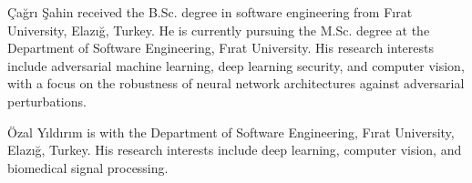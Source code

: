 
\begin{IEEEbiography}[]{{\c{C}}a\u{g}r{\i} {\c{S}}ahin}
received the B.Sc. degree in software engineering from F{\i}rat University, Elaz{\i}\u{g}, Turkey. He is currently pursuing the M.Sc. degree at the Department of Software Engineering, F{\i}rat University. His research interests include adversarial machine learning, deep learning security, and computer vision, with a focus on the robustness of neural network architectures against adversarial perturbations.
\end{IEEEbiography}

\begin{IEEEbiography}[]{\"Ozal Y{\i}ld{\i}r{\i}m}
is with the Department of Software Engineering, F{\i}rat University, Elaz{\i}\u{g}, Turkey. His research interests include deep learning, computer vision, and biomedical signal processing.
\end{IEEEbiography}

